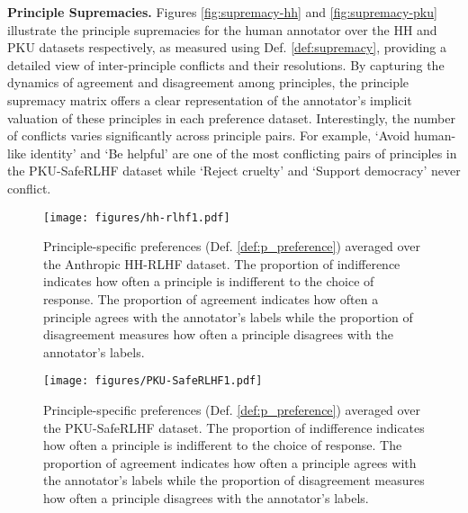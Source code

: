 \documentclass{article}
\begin{document}
\noindent \textbf{Principle Supremacies.} Figures \ref{fig:supremacy-hh} and \ref{fig:supremacy-pku} illustrate the principle supremacies for the human annotator over the HH and PKU datasets respectively, as measured using Def. \ref{def:supremacy}, providing a detailed view of inter-principle conflicts and their resolutions. By capturing the dynamics of agreement and disagreement among principles, the principle supremacy matrix offers a clear representation of the annotator's implicit valuation of these principles in each preference dataset. Interestingly, the number of conflicts varies significantly across principle pairs. For example, `Avoid human-like identity' and `Be helpful' are one of the most conflicting pairs of principles in the PKU-SafeRLHF dataset while `Reject cruelty' and `Support democracy' never conflict.
\begin{figure}
    \centering
    \texttt{[image: figures/hh-rlhf1.pdf]}
    \caption{Principle-specific preferences (Def. \ref{def:p_preference}) averaged over the Anthropic HH-RLHF dataset. The proportion of indifference indicates how often a principle is indifferent to the choice of response. The proportion of agreement indicates how often a principle agrees with the annotator's labels while the proportion of disagreement measures how often a principle disagrees with the annotator's labels.}
    \label{fig:preferences-hh}
\end{figure}

\begin{figure}
    \centering
    \texttt{[image: figures/PKU-SafeRLHF1.pdf]}
    \caption{Principle-specific preferences (Def. \ref{def:p_preference}) averaged over the PKU-SafeRLHF dataset. The proportion of indifference indicates how often a principle is indifferent to the choice of response. The proportion of agreement indicates how often a principle agrees with the annotator's labels while the proportion of disagreement measures how often a principle disagrees with the annotator's labels.}
    \label{fig:preferences-pku}
\end{figure}
\end{document}
